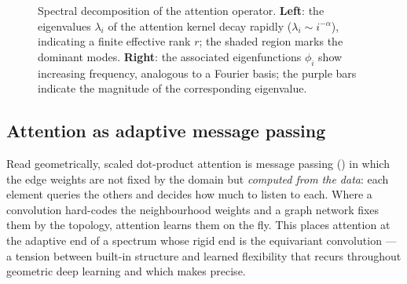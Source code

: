 \begin{figure}[h]
\caption[Spectral decomposition of attention]{Spectral decomposition of the
attention operator. \textbf{Left}: the eigenvalues $\lambda_i$ of the attention
kernel decay rapidly ($\lambda_i\sim i^{-\alpha}$), indicating a finite effective
rank $r$; the shaded region marks the dominant modes. \textbf{Right}: the
associated eigenfunctions $\phi_i$ show increasing frequency, analogous to a
Fourier basis; the purple bars indicate the magnitude of the corresponding
eigenvalue.}
\label{fig:apps:spectrum}
\end{figure}

\subsection{Attention as adaptive message passing}
\label{subsec:apps:attn-mpnn}

Read geometrically, scaled dot-product attention is message passing
() in which the edge weights are not fixed by the domain but
\emph{computed from the data}: each element queries the others and decides how
much to listen to each. Where a convolution hard-codes the neighbourhood weights
and a graph network fixes them by the topology, attention learns them on the fly.
This places attention at the adaptive end of a spectrum whose rigid end is the
equivariant convolution --- a tension between built-in structure and learned
flexibility that recurs throughout geometric deep learning and which
 makes precise.

